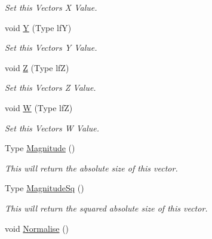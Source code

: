\begin{DoxyCompactItemize}
\begin{DoxyCompactList}\small\item\em Set this Vectors X Value. \end{DoxyCompactList}\item 
\hypertarget{classc4_d_vt_a4a5be96780fda082c94f6cdeeaba3ba9}{
void \hyperlink{classc4_d_vt_a4a5be96780fda082c94f6cdeeaba3ba9}{Y} (Type lfY)}
\label{classc4_d_vt_a4a5be96780fda082c94f6cdeeaba3ba9}

\begin{DoxyCompactList}\small\item\em Set this Vectors Y Value. \end{DoxyCompactList}\item 
\hypertarget{classc4_d_vt_a4f045d1b71055d267018cd88de8999ad}{
void \hyperlink{classc4_d_vt_a4f045d1b71055d267018cd88de8999ad}{Z} (Type lfZ)}
\label{classc4_d_vt_a4f045d1b71055d267018cd88de8999ad}

\begin{DoxyCompactList}\small\item\em Set this Vectors Z Value. \end{DoxyCompactList}\item 
\hypertarget{classc4_d_vt_ad78bbe25ff6a8ab24949add37f78e9f9}{
void \hyperlink{classc4_d_vt_ad78bbe25ff6a8ab24949add37f78e9f9}{W} (Type lfZ)}
\label{classc4_d_vt_ad78bbe25ff6a8ab24949add37f78e9f9}

\begin{DoxyCompactList}\small\item\em Set this Vectors W Value. \end{DoxyCompactList}\item 
\hypertarget{classc4_d_vt_a425e344cafeac055cf94e24cfb03ee53}{
Type \hyperlink{classc4_d_vt_a425e344cafeac055cf94e24cfb03ee53}{Magnitude} ()}
\label{classc4_d_vt_a425e344cafeac055cf94e24cfb03ee53}

\begin{DoxyCompactList}\small\item\em This will return the absolute size of this vector. \end{DoxyCompactList}\item 
\hypertarget{classc4_d_vt_a71e99c1a89107e7e0516ac015a456f20}{
Type \hyperlink{classc4_d_vt_a71e99c1a89107e7e0516ac015a456f20}{MagnitudeSq} ()}
\label{classc4_d_vt_a71e99c1a89107e7e0516ac015a456f20}

\begin{DoxyCompactList}\small\item\em This will return the squared absolute size of this vector. \end{DoxyCompactList}\item 
\hypertarget{classc4_d_vt_accffc7b4d424d4ff82df4fae8c9c4537}{
void \hyperlink{classc4_d_vt_accffc7b4d424d4ff82df4fae8c9c4537}{Normalise} ()}
\label{classc4_d_vt_accffc7b4d424d4ff82df4fae8c9c4537}


\end{DoxyCompactItemize}
